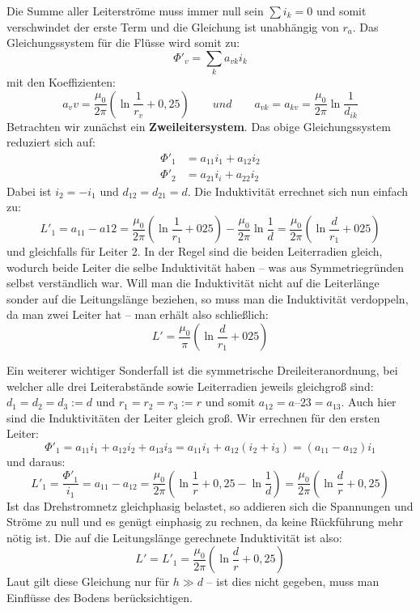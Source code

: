 Die Summe aller Leiterströme muss immer null sein $\sum i_k=0$ und somit verschwindet der erste Term und die Gleichung ist unabhängig von $r_a$. Das Gleichungssystem für die Flüsse wird somit zu:
\begin{equation}
\Phi'_v = \sum_k a_{vk}i_k
\end{equation}
mit den Koeffizienten:
\begin{equation}
a_vv = \frac{\mu_0}{2\pi} \left( \ln\frac{1}{r_v} + 0,25 \right) \qquad und \qquad a_{vk} = a_{kv} = \frac{\mu_0}{2\pi} \ln\frac{1}{d_{ik}}
\end{equation}
Betrachten wir zunächst ein \textbf{Zweileitersystem}. Das obige Gleichungssystem reduziert sich auf:
\begin{align}
\Phi'_1 &= a_{11}i_1 + a_{12}i_2 \\
\Phi'_2 &= a_{21}i_i + a_{22}i_2
\end{align}
Dabei ist $i_2 = -i_1$ und $d_{12} = d_{21} = d$. Die Induktivität errechnet sich nun einfach zu:
\begin{equation}
L'_1 = a_{11} - a{12} = \frac{\mu_0}{2\pi}\left(\ln\frac{1}{r_1}+025\right)-\frac{\mu_0}{2\pi}\ln\frac{1}{d} = 
\frac{\mu_0}{2\pi}\left(\ln\frac{d}{r_1}+025\right)
\end{equation}
und gleichfalls für Leiter 2. In der Regel sind die beiden Leiterradien gleich, wodurch beide Leiter die selbe Induktivität haben – was aus Symmetriegründen selbst verständlich war. Will man die Induktivität nicht auf die Leiterlänge sonder auf die Leitungslänge beziehen, so muss man die Induktivität verdoppeln, da man zwei Leiter hat – man erhält also schließlich:
\begin{equation}
L' = \frac{\mu_0}{\pi}\left(\ln\frac{d}{r_1}+025\right)
\end{equation}

Ein weiterer wichtiger Sonderfall ist die symmetrische Dreileiteranordnung, bei welcher alle drei Leiterabstände sowie Leiterradien jeweils gleichgroß sind: $d_1=d_2=d_3:=d$ und $r_1=r_2=r_3:=r$ und somit $a_{12}=a–{23}=a_{13}$. Auch hier sind die Induktivitäten der Leiter gleich groß. Wir errechnen für den ersten Leiter:
\begin{equation}
\Phi'_1 = a_{11}i_1+a_{12}i_2+a_{13}i_3 = a_{11}i_1+a_{12}\left(i_2+i_3\right) = \left(a_{11}-a_{12}\right)i_1
\end{equation}
und daraus:
\begin{equation}
L'_1 = \frac{\Phi'_1}{i_1} = a_{11}-a_{12} = \frac{\mu_0}{2\pi}\left(\ln\frac{1}{r}+0,25-\ln\frac{1}{d} \right) =
\frac{\mu_0}{2\pi}\left(\ln\frac{d}{r}+0,25 \right)
\end{equation}
Ist das Drehstromnetz gleichphasig belastet, so addieren sich die Spannungen und Ströme zu null und es genügt einphasig zu rechnen, da keine Rückführung mehr nötig ist. Die auf die Leitungslänge gerechnete Induktivität ist also:
\begin{equation}\label{Induktivitaet3}
L' = L'_1 = \frac{\mu_0}{2\pi}\left(\ln\frac{d}{r}+0,25 \right)
\end{equation}
Laut \cite{Harrison} gilt diese Gleichung nur für $h\gg d$ – ist dies nicht gegeben, muss man Einflüsse des Bodens berücksichtigen.

